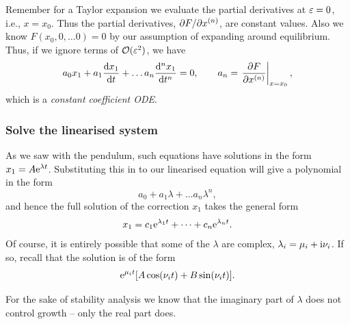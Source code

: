 \documentclass[main.tex]{subfiles}
\begin{document}
Remember for a Taylor expansion we evaluate the partial derivatives at $\varepsilon=0$, i.e., $x=x_0$. Thus the partial derivatives, $\pd{F}{x^{(n)}}$, are constant values. Also we know $F(x_0,0,\dots 0)=0$ by our assumption of expanding around equilibrium. Thus, if we ignore terms of $\mathcal{O}(\varepsilon^2)$, we have
\begin{equation}
 a_0x_1+ a_1\fd{x_1}{t}  + \dots a_n \fdn{n}{x_1}{t} =0,\qquad a_n = \left.\pd{F}{x^{(n)}}\right\vert_{x=x_0},
\end{equation}  
which is a \emph{constant coefficient ODE}. 

\subsubsection*{\StepThree Solve the linearised system}
As we saw with the pendulum, such equations have solutions in the form $x_1 = A\mathrm{e}^{\lambda t}$. Substituting this in to our linearised  equation will give a polynomial in the form
\begin{equation}
a_0 + a_1\lambda +\dots a_n\lambda^n,
\end{equation}
and hence the full solution of the correction $x_1$ takes the general form
\begin{equation}
\label{lincorr}
x_1 = c_1\mathrm{e}^{\lambda_1 t}+\dots  + c_n\mathrm{e}^{\lambda_n t}.
\end{equation}
Of course, it is entirely possible that some of the $\lambda$ are complex, $\lambda_i = \mu_i + \mathrm{i} \nu_i$. If so, recall that the solution is of the form
\begin{equation}
\mathrm{e}^{\mu_i t} [ A\cos(\nu_i t) + B \sin(\nu_i t)].
\end{equation}

For the sake of stability analysis we know that the imaginary part of $\lambda$ does not control growth -- only the real part does.
\end{document}
